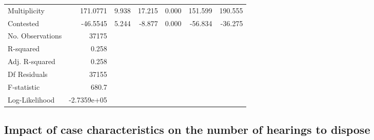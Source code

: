{\begin{longtable}{@{}lrrrrrr@{}}
Multiplicity & 171.0771 & 9.938 & 17.215 & 0.000 & 151.599 & 190.555 \\
Contested & -46.5545 & 5.244 & -8.877 & 0.000 & -56.834 & -36.275\\
\bottomrule
No. Observations & 37175 & & & & &\\
R-squared & 0.258 & & & & & \\
Adj. R-squared& 0.258& & & & & \\
Df Residuals& 37155 & & & & &\\
F-statistic & 680.7 & & & & & \\
Log-Likelihood & -2.7359e+05 & & & & & \\
\bottomrule
\end{longtable}}

\subsection{Impact of case characteristics on the number of hearings to dispose}
\label{sec:impact-case-char-1}
